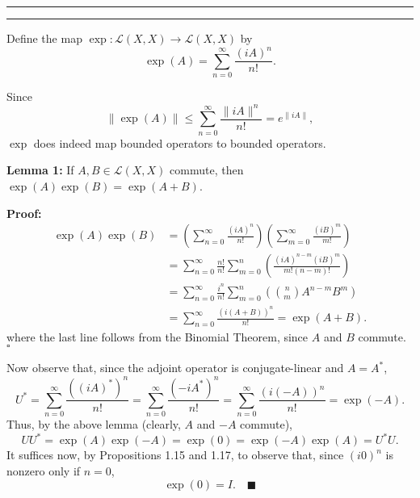 \documentclass[11pt]{article}
\newcounter{questionCounter}
\newcounter{partCounter}[questionCounter]
\newenvironment{question}[2][\arabic{questionCounter}]{%
    \setcounter{partCounter}{0}%
    \vspace{.25in} \hrule \vspace{0.5em}%
        \noindent{\bf #2}%
    \vspace{0.8em} \hrule \vspace{.10in}%
    \addtocounter{questionCounter}{1}%
}{}
\renewcommand{\qed}{\quad \ensuremath{\blacksquare}}
\renewcommand{\L}{\mathcal{L}} %
\begin{document}
\begin{question}{Problem 6}
Define the map $\exp : \L(X,X) \to \L(X,X)$ by
\[\exp(A) = \sum_{n = 0}^\infty \frac{(iA)^n}{n!}.\]

Since
\[\|\exp(A)\| \leq \sum_{n = 0}^\infty \frac{\|iA\|^n}{n!} = e^{\|iA\|},\]
$\exp$ does indeed map bounded operators to bounded operators.

{\bf Lemma 1:} If $A,B \in \L(X,X)$ commute, then
$\exp(A)\exp(B) = \exp(A + B)$.

{\bf Proof:}
\begin{align*}
\exp(A)\exp(B)
 & = \left( \sum_{n = 0}^\infty \frac{(iA)^n}{n!} \right)
     \left( \sum_{m = 0}^\infty \frac{(iB)^m}{m!} \right)   \\
 & = \sum_{n = 0}^\infty \frac{n!}{n!} \sum_{m = 0}^n
            \left( \frac{(iA)^{n - m}(iB)^m }{m!(n - m)!} \right)   \\
 & = \sum_{n = 0}^\infty \frac{i^n}{n!} \sum_{m = 0}^n
            \left( \binom{n}{m} A^{n - m}B^m \right)  \\
 & = \sum_{n = 0}^\infty \frac{(i(A + B))^n}{n!} = \exp(A + B).
\end{align*}
where the last line follows from the Binomial Theorem, since $A$ and $B$
commute. \quad $\square$

Now observe that, since the adjoint operator is conjugate-linear and $A = A^*$,
\[U^*
    = \sum_{n = 0}^\infty \frac{\left( (iA)^* \right)^n}{n!}
    = \sum_{n = 0}^\infty \frac{\left( -iA^* \right)^n}{n!}
    = \sum_{n = 0}^\infty \frac{\left( i(-A) \right)^n}{n!}
= \exp(-A).\]
Thus, by the above lemma (clearly, $A$ and $-A$ commute),
\[UU^* = \exp(A)\exp(-A) = \exp(0) = \exp(-A)\exp(A) = U^*U.\]
It suffices now, by Propositions 1.15 and 1.17, to observe that, since
$(i 0)^n$ is nonzero only if $n = 0$,
\[\exp(0) = I. \qed\]
\end{question}
\end{document}
